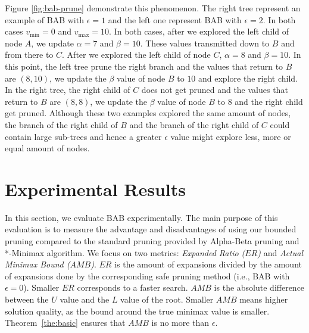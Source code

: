 \documentclass[runningheads]{llncs}
\newcounter{bab}
\newcommand{\pess}{\mathit{L}}
\newcommand{\opti}{\mathit{U}}
\newcommand{\vmax}{v_{\text{max}}}
\newcommand{\vmin}{v_{\text{min}}}
\newcommand{\amb}{\mathit{AMB}}
\newcommand{\er}{\mathit{ER}}
\begin{document}
Figure \ref{fig:bab-prune} demonstrate this phenomenon. The right tree represent an example of BAB with $\epsilon = 1$ and the left one represent BAB with $\epsilon = 2$. In both cases $\vmin = 0$ and $\vmax = 10$. In both cases, after we explored the left child of node $A$, we update $\alpha = 7$ and $\beta = 10$. These values transmitted down to $B$ and from there to $C$. After we explored the left child of node $C$, $\alpha = 8$ and $\beta = 10$. In this point, the left tree prune the right branch and the values that return to $B$ are $(8,10)$, we update the $\beta$ value of node $B$ to $10$ and explore the right child. In the right tree, the right child of $C$ does not get pruned and the values that return to $B$ are $(8,8)$, we update the $\beta$ value of node $B$ to $8$ and the right child get pruned.
Although these two examples explored the same amount of nodes, the branch of the right child of $B$ and the branch of the right child of $C$ could contain large sub-trees and hence a greater $\epsilon$ value might explore less, more or equal amount of nodes. 







\section{Experimental Results}

In this section, we evaluate BAB experimentally. 
The main purpose of this evaluation is to measure the advantage and disadvantages of using our bounded pruning compared to the standard pruning provided by Alpha-Beta pruning and *-Minimax algorithm. We focus on two metrics: \emph{Expanded Ratio ($\er$)} and \emph{Actual Minimax Bound ($\amb$)}.
$\er$ is the amount of expansions divided by the amount of expansions done by the corresponding safe pruning method (i.e., BAB with $\epsilon=0$). Smaller $\er$ corresponds to a faster search. 
$\amb$ is the absolute difference between the $\opti$ value and the $\pess$ value of the root. Smaller $\amb$ means higher solution quality, as the bound around the true minimax value is smaller.
Theorem~\ref{the:basic} ensures that $\amb$ is no more than $\epsilon$.
\end{document}
